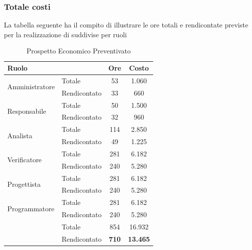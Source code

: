 \subsubsection{Totale costi}
La tabella seguente ha il compito di illustrare le ore totali e rendicontate previste per la realizzazione di \project{} suddivise per ruoli
\begin{table}[!h]
	\centering
	\begin{tabular}{|l|l|c|c|}
		\hline
			Ruolo& & Ore & Costo\\ \hline
			\multicolumn{1}{|l|}{\multirow{2}{*}{Amministratore}} & \multicolumn{1}{|l|}{Totale} & 53 & 1.060 \\
			\cline{2-4}
			&\multicolumn{1}{|l|}{Rendicontato} &33&660\\
		\hline
		\hline
			\multicolumn{1}{|l|}{\multirow{2}{*}{Responsabile}} & \multicolumn{1}{|l|}{Totale} & 50 & 1.500\\
			\cline{2-4}
			&\multicolumn{1}{|l|}{Rendicontato} &32&960\\
		\hline
		\hline
			\multicolumn{1}{|l|}{\multirow{2}{*}{Analista}} & \multicolumn{1}{|l|}{Totale} & 114 &2.850\\
			\cline{2-4}
			&\multicolumn{1}{|l|}{Rendicontato} &49&1.225\\
		\hline
		\hline
			\multicolumn{1}{|l|}{\multirow{2}{*}{Verificatore}} & \multicolumn{1}{|l|}{Totale} & 281 &6.182\\
			\cline{2-4}
			&\multicolumn{1}{|l|}{Rendicontato} &240 & 5.280\\
		\hline
		\hline
			\multicolumn{1}{|l|}{\multirow{2}{*}{Progettista}} & \multicolumn{1}{|l|}{Totale} & 281 &6.182\\
			\cline{2-4}
			&\multicolumn{1}{|l|}{Rendicontato} &240 & 5.280\\
		\hline
		\hline
			\multicolumn{1}{|l|}{\multirow{2}{*}{Programmatore}} & \multicolumn{1}{|l|}{Totale} & 281 &6.182\\
			\cline{2-4}
			&\multicolumn{1}{|l|}{Rendicontato} &240 & 5.280\\
		\hline
		\hline
			\multicolumn{1}{|l|}{\multirow{2}{*}{}} & \multicolumn{1}{|l|}{Totale} &854  &16.932\\
			\cline{2-4}
			&\multicolumn{1}{|l|}{Rendicontato} & \textbf{710} & \textbf{13.465}\\
		\hline
		\hline
	\end{tabular}
	\caption{Prospetto Economico Preventivato}
	\label{prosp}
\end{table}
